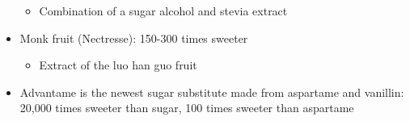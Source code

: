 \documentclass[12pt]{article}
\begin{document}
\begin{itemize}
                    \begin{itemize}
                        \item Combination of a sugar alcohol and stevia extract
                    \end{itemize}
                \item Monk fruit (Nectresse): 150-300 times sweeter
                    \begin{itemize}
                        \item Extract of the luo han guo fruit
                    \end{itemize}
                \item Advantame is the newest sugar substitute made from aspartame and vanillin: 20,000 times sweeter than sugar, 100 times sweeter than aspartame
            \end{itemize}
\end{document}
